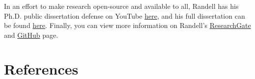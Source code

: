 \documentclass[11pt]{article}
\begin{document}
In an effort to make research open-source and available to all, Randell 
has his Ph.D. public dissertation defense on YouTube 
\href{https://www.youtube.com/watch?v=PpVOXf6_830&t=162s}{here}, and 
his full dissertation can be found 
\href{https://ir.library.oregonstate.edu/concern/graduate_thesis_or_dissertations/2v23w237z}{here}.
Finally, you can view more information on Randell's 
\href{https://www.researchgate.net/profile/Zachary-Randell}{ResearchGate}
 and \href{https://github.com/zhrandell}{GitHub} page. 




\clearpage
\section{References}
\printbibliography[heading=none]
\label{References}





\end{document}
